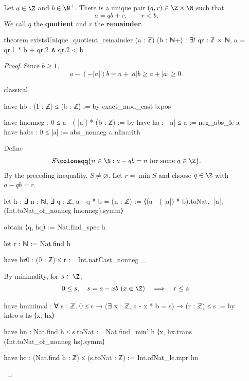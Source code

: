 \begin{theorem} \label{nt:thm:division-algorithm}
  Let $a\in\Z$ and $b\in\N^+$. There is a unique pair
  $(q,r)\in\Z\times\N$ such that
  \[
    a=qb+r, \qquad r<b.
  \]
  We call $q$ the \textbf{quotient} and $r$ the \textbf{remainder}.

  \begin{lean}
    theorem existsUnique_quotient_remainder (a : ℤ) (b : ℕ+) :
        ∃! qr : ℤ × ℕ,
          a = qr.1 * b + qr.2 ∧ qr.2 < b
  \end{lean}
\end{theorem}

\begin{proof}
  Since $b\ge1$,
  \[
    a-(-|a|)b=a+|a|b\ge a+|a|\ge0.
  \]

  \begin{lean}
    classical

    have hb : (1 : ℤ) ≤ (b : ℤ) := by
      exact_mod_cast b.pos

    have hnonneg : 0 ≤ a - (-|a|) * (b : ℤ) := by
      have ha : -|a| ≤ a := neg_abs_le a
      have habs : 0 ≤ |a| := abs_nonneg a
      nlinarith
  \end{lean}

  Define
  \[
    S\coloneqq\{n\in\N: a-qb=n\text{ for some }q\in\Z\}.
  \]
  By the preceding inequality, $S\ne\varnothing$.
  Let $r=\min S$ and choose $q\in\Z$ with $a-qb=r$.

  \begin{lean}
    let h : ∃ n : ℕ, ∃ q : ℤ, a - q * b = (n : ℤ) :=
      ⟨(a - (-|a|) * b).toNat, -|a|, (Int.toNat_of_nonneg hnonneg).symm⟩

    obtain ⟨q, hq⟩ := Nat.find_spec h

    let r : ℕ := Nat.find h

    have hr0 : (0 : ℤ) ≤ r := Int.natCast_nonneg _
  \end{lean}

  By minimality, for $s\in\Z$,
  \[
    0\le s,\quad s=a-xb\ (x\in\Z)\quad\Longrightarrow\quad r\le s.
  \]

  \begin{lean}
    have hminimal :
        ∀ s : ℤ, 0 ≤ s → (∃ x : ℤ, a - x * b = s) → (r : ℤ) ≤ s := by
      intro s hs ⟨x, hx⟩

      have hn : Nat.find h ≤ s.toNat :=
        Nat.find_min' h ⟨x, hx.trans (Int.toNat_of_nonneg hs).symm⟩

      have hc : (Nat.find h : ℤ) ≤ (s.toNat : ℤ) :=
        Int.ofNat_le.mpr hn


\end{lean}
\end{proof}
